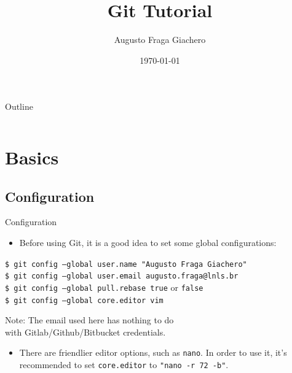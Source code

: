 \documentclass{beamer}
\title{Git Tutorial}
\author{Augusto Fraga Giachero}
\date{\today}
\begin{document}
\begin{frame}
  \titlepage
\end{frame}

\begin{frame}{Outline}
  \begin{columns}
    \begin{column}[T]{0.5\textwidth}
      \tableofcontents[sections=1]
    \end{column}
    \begin{column}[T]{0.5\textwidth}
      \tableofcontents[sections=2]
    \end{column}
  \end{columns}
\end{frame}

\section{Basics}

\subsection{Configuration}
\begin{frame}{Configuration}
  \begin{itemize}
    \item Before using Git, it is a good idea to set some global configurations:
  \end{itemize}
  \begin{block}{}
    \texttt{\$ git config --global user.name "Augusto Fraga Giachero"} \\
    \texttt{\$ git config --global user.email augusto.fraga@lnls.br} \\
    \texttt{\$ git config --global pull.rebase true} or \texttt{false} \\
    \texttt{\$ git config --global core.editor vim}
  \end{block}
  \begin{flushright}
    Note: The email used here has nothing to do \\ with Gitlab/Github/Bitbucket credentials.
  \end{flushright}
  \begin{itemize}
    \item There are friendlier editor options, such as \texttt{nano}. In order to use it, it's recommended to set \texttt{core.editor} to \texttt{"nano -r 72 -b"}.
  \end{itemize}
\end{frame}
\end{document}
